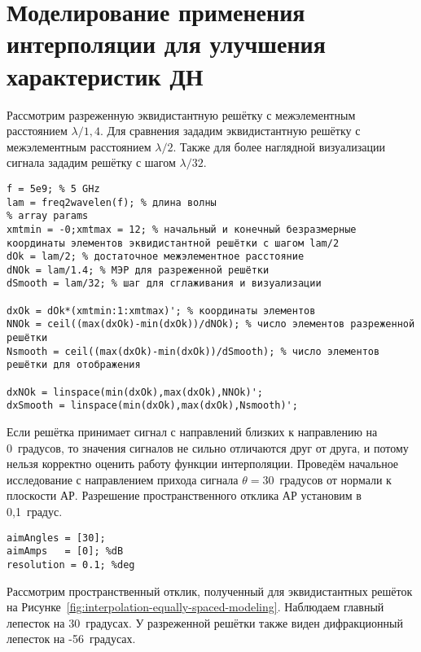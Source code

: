 \section{Моделирование применения интерполяции для улучшения характеристик ДН}\label{sect:interpolation-modeling}

Рассмотрим разреженную эквидистантную решётку с межэлементным расстоянием $\lambda/1,4$. 
Для сравнения зададим эквидистантную решётку с межэлементным расстоянием $\lambda/2$. Также для более 
наглядной визуализации сигнала зададим решётку с шагом $\lambda/32$.

\begin{verbatim}
f = 5e9; % 5 GHz
lam = freq2wavelen(f); % длина волны
% array params
xmtmin = -0;xmtmax = 12; % начальный и конечный безразмерные координаты элементов эквидистантной решётки с шагом lam/2
dOk = lam/2; % достаточное межэлементное расстояние
dNOk = lam/1.4; % МЭР для разреженной решётки
dSmooth = lam/32; % шаг для сглаживания и визуализации

dxOk = dOk*(xmtmin:1:xmtmax)'; % координаты элементов
NNOk = ceil((max(dxOk)-min(dxOk))/dNOk); % число элементов разреженной решётки
Nsmooth = ceil((max(dxOk)-min(dxOk))/dSmooth); % число элементов решётки для отображения

dxNOk = linspace(min(dxOk),max(dxOk),NNOk)';
dxSmooth = linspace(min(dxOk),max(dxOk),Nsmooth)';
\end{verbatim}

Если решётка принимает сигнал с направлений близких к направлению на 0~градусов, то значения сигналов не 
сильно отличаются друг от друга, и потому нельзя корректно оценить работу функции интерполяции. 
Проведём начальное исследование с направлением прихода сигнала $\theta=30$~градусов от нормали к плоскости АР. 
Разрешение пространственного отклика АР установим в {0,1}~градус.

\begin{verbatim}
aimAngles = [30];
aimAmps   = [0]; %dB
resolution = 0.1; %deg
\end{verbatim}

Рассмотрим пространственный отклик, полученный для эквидистантных решёток на 
Рисунке~\ref{fig:interpolation-equally-spaced-modeling}.
Наблюдаем главный лепесток на 30~градусах. 
У разреженной решётки также виден дифракционный лепесток на -56~градусах.


